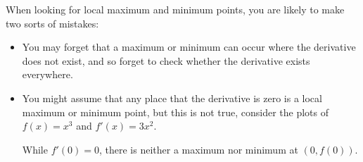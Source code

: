 \documentclass{ximera}
\begin{document}
\begin{warning} 
	When looking for local maximum and minimum points, you are likely to
	make two sorts of mistakes: 
	\begin{itemize}
		\item You may forget that a maximum or minimum can occur where the
		  derivative does not exist, and so forget to check whether the
		  derivative exists everywhere. 
		\item You might assume that any place that the derivative is zero is a
		  local maximum or minimum point, but this is not true, consider the
		  plots of $f(x) = x^3$ and $f'(x) = 3x^2$.
			\begin{image}
		\end{image}
		While $f'(0)=0$, there is neither a maximum nor minimum at $(0,f(0))$.
	\end{itemize}
\end{warning}
\end{document}
